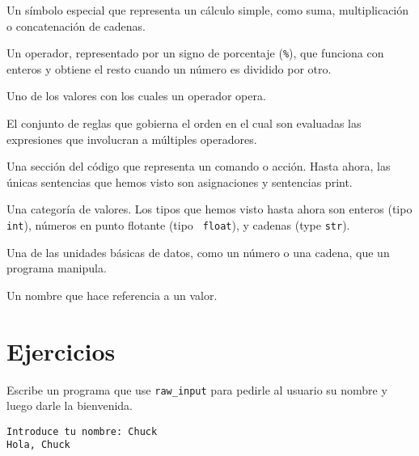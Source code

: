 \begin{descripción}
\item[operador:]  Un símbolo especial que representa un cálculo simple, como
suma, multiplicación o concatenación de cadenas.

\item[operador módulo:]  Un operador, representado por un signo de porcentaje
({\tt \%}), que funciona con enteros y obtiene el resto cuando
un número es dividido por otro.

\item[operando:]  Uno de los valores con los cuales un operador opera.

\item[reglas de precedencia:]  El conjunto de reglas que gobierna el orden en el cual
son evaluadas las expresiones que involucran a múltiples operadores.

\item[sentencia:]  Una sección del código que representa un comando o acción.
Hasta ahora, las únicas sentencias que hemos visto son asignaciones y sentencias print.

\item[tipo:] Una categoría de valores. Los tipos que hemos visto hasta ahora
son enteros (tipo {\tt int}), números en punto flotante (tipo {\tt
float}), y cadenas (type {\tt str}).

\item[valor:]  Una de las unidades básicas de datos, como un número o una cadena,
que un programa manipula.

\item[variable:]  Un nombre que hace referencia a un valor.

\end{descripción}

\section{Ejercicios}

\begin{ex}
Escribe un programa que use \verb"raw_input" para pedirle al usuario su nombre
y luego darle la bienvenida.

\begin{verbatim}
Introduce tu nombre: Chuck
Hola, Chuck
\end{verbatim}

\end{ex}


